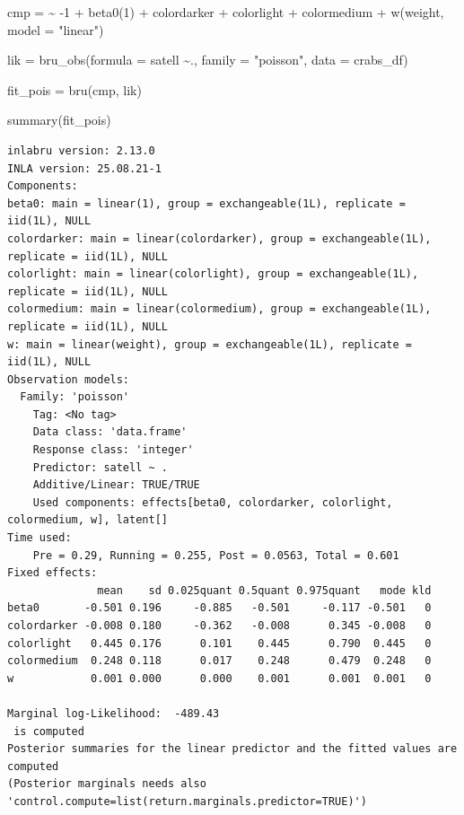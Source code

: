 \documentclass[
  letterpaper,
  DIV=11,
  numbers=noendperiod]{scrartcl}
\newenvironment{Shaded}{\begin{snugshade}}{\end{snugshade}}
\newcommand{\AttributeTok}[1]{\textcolor[rgb]{0.40,0.45,0.13}{#1}}
\newcommand{\DecValTok}[1]{\textcolor[rgb]{0.68,0.00,0.00}{#1}}
\newcommand{\ErrorTok}[1]{\textcolor[rgb]{0.68,0.00,0.00}{#1}}
\newcommand{\FunctionTok}[1]{\textcolor[rgb]{0.28,0.35,0.67}{#1}}
\newcommand{\NormalTok}[1]{\textcolor[rgb]{0.00,0.23,0.31}{#1}}
\newcommand{\OtherTok}[1]{\textcolor[rgb]{0.00,0.23,0.31}{#1}}
\newcommand{\SpecialCharTok}[1]{\textcolor[rgb]{0.37,0.37,0.37}{#1}}
\newcommand{\StringTok}[1]{\textcolor[rgb]{0.13,0.47,0.30}{#1}}
\begin{document}
\begin{Shaded}
\begin{Highlighting}[]
\NormalTok{cmp }\OtherTok{=}  \ErrorTok{\textasciitilde{}} \SpecialCharTok{{-}}\DecValTok{1} \SpecialCharTok{+} \FunctionTok{beta0}\NormalTok{(}\DecValTok{1}\NormalTok{) }\SpecialCharTok{+}\NormalTok{  colordarker }\SpecialCharTok{+}
\NormalTok{       colorlight }\SpecialCharTok{+}\NormalTok{ colormedium }\SpecialCharTok{+}
       \FunctionTok{w}\NormalTok{(weight, }\AttributeTok{model =} \StringTok{"linear"}\NormalTok{)}

\NormalTok{lik }\OtherTok{=}  \FunctionTok{bru\_obs}\NormalTok{(}\AttributeTok{formula =}\NormalTok{ satell }\SpecialCharTok{\textasciitilde{}}\NormalTok{.,}
            \AttributeTok{family =} \StringTok{"poisson"}\NormalTok{,}
            \AttributeTok{data =}\NormalTok{ crabs\_df)}

\NormalTok{fit\_pois }\OtherTok{=} \FunctionTok{bru}\NormalTok{(cmp, lik)}

\FunctionTok{summary}\NormalTok{(fit\_pois)}
\end{Highlighting}
\end{Shaded}

\begin{verbatim}
inlabru version: 2.13.0
INLA version: 25.08.21-1
Components:
beta0: main = linear(1), group = exchangeable(1L), replicate = iid(1L), NULL
colordarker: main = linear(colordarker), group = exchangeable(1L), replicate = iid(1L), NULL
colorlight: main = linear(colorlight), group = exchangeable(1L), replicate = iid(1L), NULL
colormedium: main = linear(colormedium), group = exchangeable(1L), replicate = iid(1L), NULL
w: main = linear(weight), group = exchangeable(1L), replicate = iid(1L), NULL
Observation models:
  Family: 'poisson'
    Tag: <No tag>
    Data class: 'data.frame'
    Response class: 'integer'
    Predictor: satell ~ .
    Additive/Linear: TRUE/TRUE
    Used components: effects[beta0, colordarker, colorlight, colormedium, w], latent[]
Time used:
    Pre = 0.29, Running = 0.255, Post = 0.0563, Total = 0.601 
Fixed effects:
              mean    sd 0.025quant 0.5quant 0.975quant   mode kld
beta0       -0.501 0.196     -0.885   -0.501     -0.117 -0.501   0
colordarker -0.008 0.180     -0.362   -0.008      0.345 -0.008   0
colorlight   0.445 0.176      0.101    0.445      0.790  0.445   0
colormedium  0.248 0.118      0.017    0.248      0.479  0.248   0
w            0.001 0.000      0.000    0.001      0.001  0.001   0

Marginal log-Likelihood:  -489.43 
 is computed 
Posterior summaries for the linear predictor and the fitted values are computed
(Posterior marginals needs also 'control.compute=list(return.marginals.predictor=TRUE)')
\end{verbatim}
\end{document}
